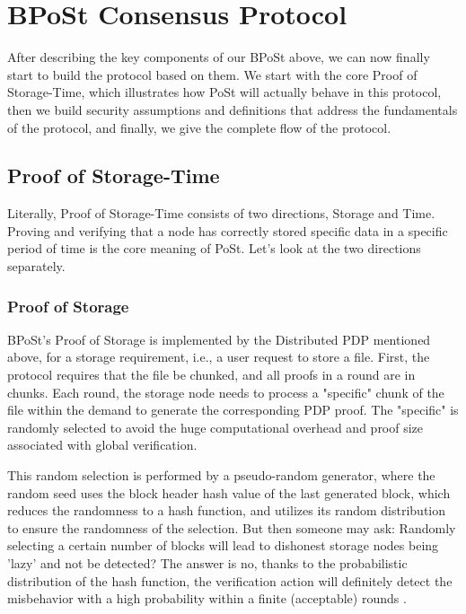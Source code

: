 \documentclass[journal]{IEEEtran}
\begin{document}
\section{BPoSt Consensus Protocol}
After describing the key components of our BPoSt above, we can now finally start to build the protocol based on them. We start with the core Proof of Storage-Time, which illustrates how PoSt will actually behave in this protocol, then we build security assumptions and definitions that address the fundamentals of the protocol, and finally, we give the complete flow of the protocol.


\subsection{Proof of Storage-Time}
Literally, Proof of Storage-Time consists of two directions, Storage and Time. Proving and verifying that a node has correctly stored specific data in a specific period of time is the core meaning of PoSt. Let's look at the two directions separately.


\subsubsection{Proof of Storage}
BPoSt's Proof of Storage is implemented by the Distributed PDP mentioned above, for a storage requirement, i.e., a user request to store a file. First, the protocol requires that the file be chunked, and all proofs in a round are in chunks. Each round, the storage node needs to process a "specific" chunk of the file within the demand to generate the corresponding PDP proof. The "specific" is randomly selected to avoid the huge computational overhead and proof size associated with global verification. 


This random selection is performed by a pseudo-random generator, where the random seed uses the block header hash value of the last generated block, which reduces the randomness to a hash function, and utilizes its random distribution to ensure the randomness of the selection. But then someone may ask: Randomly selecting a certain number of blocks will lead to dishonest storage nodes being 'lazy' and not be detected? The answer is no, thanks to the probabilistic distribution of the hash function, the verification action will definitely detect the misbehavior with a high probability within a finite (acceptable) rounds \cite{2023epost}.
\end{document}
